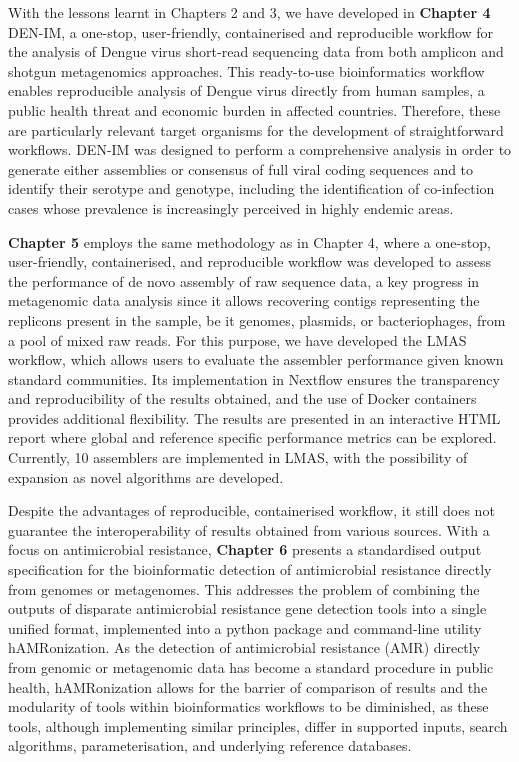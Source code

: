 With the lessons learnt in Chapters 2 and 3, we have developed in \textbf{Chapter 4}  DEN-IM, a one-stop, user-friendly, containerised and reproducible workflow for the analysis of Dengue virus short-read sequencing data from both amplicon and shotgun metagenomics approaches. This ready-to-use bioinformatics workflow enables reproducible analysis of Dengue virus directly from human samples, a public health threat and economic burden in affected countries. Therefore, these are particularly relevant target organisms for the development of straightforward workflows. DEN-IM was designed to perform a comprehensive analysis in order to generate either assemblies or consensus of full viral coding sequences and to identify their serotype and genotype, including the identification of co-infection cases whose prevalence is increasingly perceived in highly endemic areas.

\textbf{Chapter 5} employs the same methodology as in Chapter 4, where a one-stop, user-friendly, containerised, and reproducible workflow was developed to assess the performance of de novo assembly of raw sequence data, a key progress in metagenomic data analysis since it allows recovering contigs representing the replicons present in the sample, be it genomes, plasmids, or bacteriophages, from a pool of mixed raw reads. For this purpose, we have developed the LMAS workflow, which allows users to evaluate the assembler performance given known standard communities. Its implementation in Nextflow ensures the transparency and reproducibility of the results obtained, and the use of Docker containers provides additional flexibility. The results are presented in an interactive HTML report where global and reference specific performance metrics can be explored. Currently, 10 assemblers are implemented in LMAS, with the possibility of expansion as novel algorithms are developed.


Despite the advantages of reproducible, containerised workflow, it still does not guarantee the interoperability of results obtained from various sources. With a focus on antimicrobial resistance, \textbf{Chapter 6} presents a standardised output specification for the bioinformatic detection of antimicrobial resistance directly from genomes or metagenomes. This addresses the problem of combining the outputs of disparate antimicrobial resistance gene detection tools into a single unified format, implemented into a python package and command-line utility hAMRonization. As the detection of antimicrobial resistance (AMR) directly from genomic or metagenomic data has become a standard procedure in public health, hAMRonization allows for the barrier of comparison of results and the modularity of tools within bioinformatics workflows to be diminished, as these tools, although implementing similar principles, differ in supported inputs, search algorithms, parameterisation, and underlying reference databases. 


